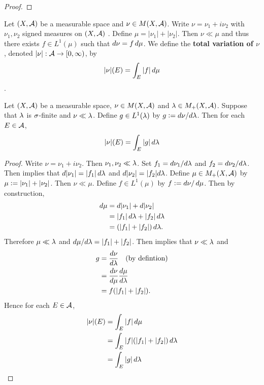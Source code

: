 \documentclass{book}
\begin{document}
	\begin{proof}
	\end{proof}
	
	\begin{defn} 
	Let $(X,\mathcal{A})$ be a measurable space and $\nu \in M(X,\mathcal{A})$. Write $\nu = \nu_1 + i \nu_2$ with $\nu_1, \nu_2$ signed measures on $(X, \mathcal{A})$ . Define $\mu = |\nu_1| + |\nu_2|$. Then $\nu \ll \mu$ and thus there exists $f \in L^1(\mu)$ such that $d\nu = f \, d \mu$. We define the \textbf{total variation of $\nu$}, denoted $|\nu|: \mathcal{A} \rightarrow [0,\infty)$, by 
	$$|\nu|(E) = \int_E |f|\, d \mu$$. 
	\end{defn}
	
	
	\begin{ex}  
	Let $(X,\mathcal{A})$ be a measurable space, $\nu \in M(X,\mathcal{A})$ and $\lambda \in M_+(X, \mathcal{A})$. Suppose that $\lambda$ is $\sigma$-finite and $\nu \ll \lambda$. Define $g \in L^1(\lambda)$ by $g \vcentcolon= d\nu / d\lambda$. Then for each $E \in \mathcal{A}$, 
	$$|\nu|(E) = \int_E |g| \, d \lambda$$
	\end{ex}
	
	\begin{proof}
	Write $\nu = \nu_1 + i \nu_2$. Then $\nu_1, \nu_2 \ll \lambda$. Set $f_1 = d\nu_1 / d\lambda$ and $f_2 = d\nu_2 / d\lambda$. Then  implies that $d|\nu_1| = |f_1| \, d \lambda$ and $d|\nu_2| = |f_2|d\lambda$. Define $\mu \in M_+(X, \mathcal{A})$ by $\mu \vcentcolon= |\nu_1| + |\nu_2|$. Then $\nu \ll \mu$. Define $f \in L^1(\mu)$ by $f \vcentcolon= d\nu / \, d \mu$. Then by construction, 
	\begin{align*}
	d\mu
	&= d|\nu_1| + d|\nu_2| \\
	&= |f_1| \, d \lambda + |f_2| \, d \lambda \\
	&= (|f_1| + |f_2|) \, d \lambda.
	\end{align*}
	Therefore $\mu \ll \lambda$ and $d\mu / d \lambda = |f_1| + |f_2|$. Then  implies that $\nu \ll \lambda$ and
	\begin{align*}
	g
	& = \frac{d\nu}{d\lambda} \quad \text{(by defintion)} \\
	& = \frac{d\nu}{d\mu} \frac{d\mu}{d\lambda} \\
	& = f(|f_1|+|f_2|).
	\end{align*}
	Hence for each $E \in \mathcal{A}$, 
	\begin{align*}
	|\nu|(E) 
	&= \int_E |f| \, d \mu \\
	&= \int_E |f| (|f_1| + |f_2|) \, d\lambda \\
	&= \int_E|g| \, d\lambda 
	\end{align*}
	\end{proof}
	
\end{document}
